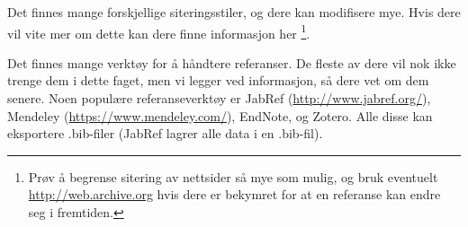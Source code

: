 Det finnes mange forskjellige siteringsstiler, og dere kan modifisere mye. Hvis dere vil vite mer om dette
kan dere finne informasjon her \cite{BiberBibtexEtc,WikibookLatex}\footnote{Prøv å begrense sitering av 
nettsider så mye som mulig, og bruk eventuelt \url{http://web.archive.org} hvis dere er bekymret for at en 
referanse kan endre seg i fremtiden.}.

Det finnes mange verktøy for å håndtere referanser. 
De fleste av dere vil nok ikke trenge dem i dette faget, men vi legger ved informasjon, så dere vet om dem 
senere. Noen populære referanseverktøy er JabRef (\url{http://www.jabref.org/}), Mendeley (\url{https://www.mendeley.com/}), EndNote, og Zotero. Alle disse kan eksportere .bib-filer (JabRef lagrer alle
data i en .bib-fil).
